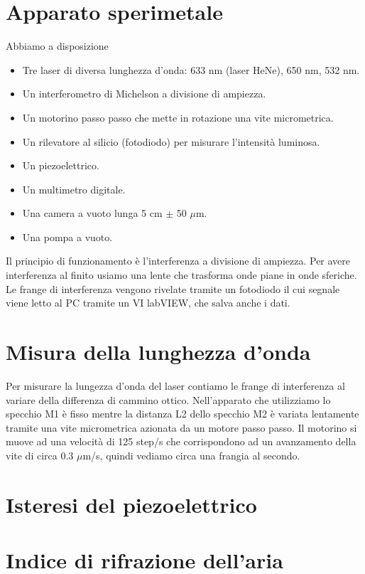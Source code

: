\documentclass[a4paper]{article}
\begin{document}
\section{Apparato sperimetale}

	Abbiamo a disposizione 
	\begin{itemize}
		\item Tre laser di diversa lunghezza d'onda: 633 nm (laser HeNe), 650 nm, 532 nm.
		\item Un interferometro di Michelson a divisione di ampiezza.
		\item Un motorino passo passo che mette in rotazione una vite micrometrica.
		\item Un rilevatore al silicio (fotodiodo) per misurare l'intensità luminosa.
		\item Un piezoelettrico.
		\item Un multimetro digitale.
		\item Una camera a vuoto lunga 5 cm $\pm$ 50 $\mu$m.
		\item Una pompa a vuoto.
	\end{itemize}
Il principio di funzionamento è l'interferenza a divisione di ampiezza. Per avere interferenza al finito usiamo una lente che trasforma onde piane in onde sferiche. Le frange di interferenza vengono rivelate tramite un fotodiodo il cui segnale viene letto al PC tramite un VI labVIEW, che salva anche i dati.

\section{Misura della lunghezza d'onda}
Per misurare la lungezza d'onda del laser contiamo le frange di interferenza al variare della differenza di cammino ottico. Nell'apparato che utilizziamo lo specchio M1 è fisso mentre la distanza L2 dello specchio M2 è variata lentamente tramite una vite micrometrica azionata da un motore passo passo.
Il motorino si muove ad una velocità di 125 step/s che corrispondono ad un avanzamento della vite di circa 0.3 $\mu$m/s, quindi vediamo circa una frangia al secondo.

\section{Isteresi del piezoelettrico}

\section{Indice di rifrazione dell'aria}
\end{document}
